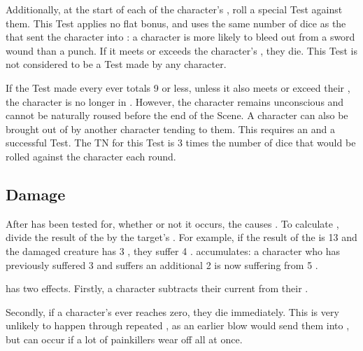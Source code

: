 Additionally, at the start of each of the {\shocked} character's {\turns}, roll a special Test against them.
This Test applies no flat bonus, and uses the same number of dice as the {\damagetest} that sent the character into {\shock}: a character is more likely to bleed out from a sword wound than a punch.
If it meets or exceeds the {\shocked} character's , they die.
This Test is not considered to be a Test made by any character.

If the Test made every {\turn} ever totals 9 or less, unless it also meets or exceed their , the character is no longer in {\shock}.
However, the character remains unconscious and cannot be naturally roused before the end of the Scene.
A character can also be brought out of {\shock} by another character tending to them.
This requires an {\action} and a successful  Test.
The TN for this Test is 3 times the number of dice that would be rolled against the {\shocked} character each round.

\subsection{Damage}

After {\shock} has been tested for, whether or not it occurs, the {\damagetest} causes {\damage}.
To calculate {\damage}, divide the result of the {\damagetest} by the target's .
For example, if the result of the {\damagetest} is 13 and the damaged creature has 3 , they suffer 4 {\damage}.
{\damage} accumulates: a character who has previously suffered 3 {\damage} and suffers an additional 2 is now suffering from 5 {\damage}.

{\damage} has two effects.
Firstly, a character subtracts their current {\damage} from their .

Secondly, if a character's  ever reaches zero, they die immediately.
This is very unlikely to happen through repeated {\damage}, as an earlier blow would send them into {\shock}, but can occur if a lot of painkillers wear off all at once.

